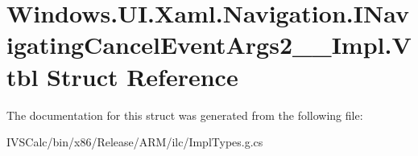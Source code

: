 \hypertarget{struct_windows_1_1_u_i_1_1_xaml_1_1_navigation_1_1_i_navigating_cancel_event_args2_____impl_1_1_vtbl}{}\section{Windows.\+U\+I.\+Xaml.\+Navigation.\+I\+Navigating\+Cancel\+Event\+Args2\+\_\+\+\_\+\+Impl.\+Vtbl Struct Reference}
\label{struct_windows_1_1_u_i_1_1_xaml_1_1_navigation_1_1_i_navigating_cancel_event_args2_____impl_1_1_vtbl}


The documentation for this struct was generated from the following file\+:\begin{DoxyCompactItemize}
\item 
I\+V\+S\+Calc/bin/x86/\+Release/\+A\+R\+M/ilc/Impl\+Types.\+g.\+cs\end{DoxyCompactItemize}
